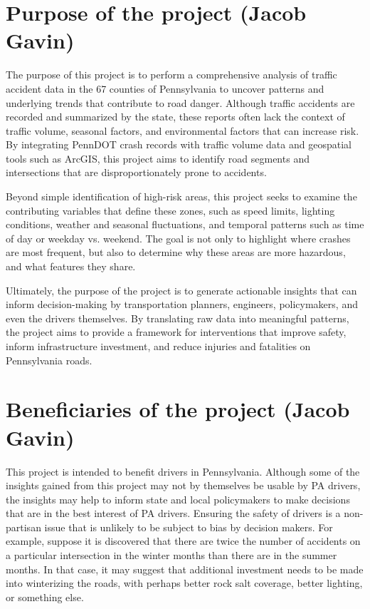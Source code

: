 \documentclass[journal]{IEEEtran}
\begin{document}


\section{Purpose of the project (Jacob Gavin)}
The purpose of this project is to perform a comprehensive analysis of traffic accident data in the 67 counties of Pennsylvania to uncover patterns and underlying trends that contribute to road danger. Although traffic accidents are recorded and summarized by the state, these reports often lack the context of traffic volume, seasonal factors, and environmental factors that can increase risk. By integrating PennDOT crash records with traffic volume data and geospatial tools such as ArcGIS, this project aims to identify road segments and intersections that are disproportionately prone to accidents. 

Beyond simple identification of high-risk areas, this project seeks to examine the contributing variables that define these zones, such as speed limits, lighting conditions, weather and seasonal fluctuations, and temporal patterns such as time of day or weekday vs. weekend. The goal is not only to highlight where crashes are most frequent, but also to determine why these areas are more hazardous, and what features they share. 

Ultimately, the purpose of the project is to generate actionable insights that can inform decision-making by transportation planners, engineers, policymakers, and even the drivers themselves. By translating raw data into meaningful patterns, the project aims to provide a framework for interventions that improve safety, inform infrastructure investment, and reduce injuries and fatalities on Pennsylvania roads.


\section{Beneficiaries of the project (Jacob Gavin)}
This project is intended to benefit drivers in Pennsylvania. Although some of the insights gained from this project may not by themselves be usable by PA drivers, the insights may help to inform state and local policymakers to make decisions that are in the best interest of PA drivers. Ensuring the safety of drivers is a non-partisan issue that is unlikely to be subject to bias by decision makers. For example, suppose it is discovered that there are twice the number of accidents on a particular intersection in the winter months than there are in the summer months. In that case, it may suggest that additional investment needs to be made into winterizing the roads, with perhaps better rock salt coverage, better lighting, or something else. 
\end{document}
